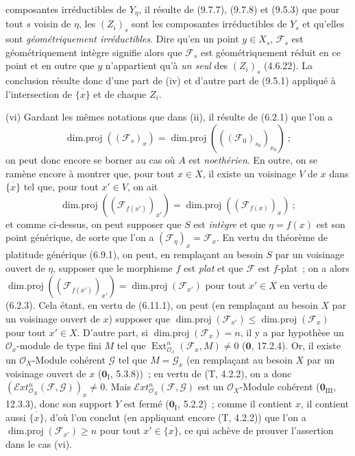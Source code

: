 
composantes irréductibles de $Y_\eta$, il résulte de (9.7.7), (9.7.8) et
(9.5.3) que pour tout $s$ voisin de $\eta$, les $(Z_i)_s$ sont les composantes
irréductibles de $Y_s$ et qu'elles sont \emph{géométriquement irréductibles}.
Dire qu'en un point $y\in X_s$, $\mathcal F_s$ est géométriquement intègre
signifie alors que $\mathcal F_s$ est géométriquement réduit en ce point et en
outre que $y$ n'appartient qu'à \emph{un seul} des $(Z_i)_s$ (4.6.22). La
conclusion résulte donc d'une part de (iv) et d'autre part de (9.5.1) appliqué à
l'intersection de $\overline{\{x\}}$ et de chaque $Z_i$.

(vi) Gardant les mêmes notations que dans (ii), il résulte de (6.2.1) que l'on
a
\[
\operatorname{dim.proj}((\mathcal F_s)_x)=
\operatorname{dim.proj}(((\mathcal F_0)_{s_0})_{x_0})~;
\]
on peut donc encore se borner au cas où $A$ est \emph{noethérien}. En outre, on
se ramène encore à montrer que, pour tout $x\in X$, il existe un voisinage $V$
de $x$ dans $\overline{\{x\}}$ tel que, pour tout $x'\in V$, on ait
\[
\operatorname{dim.proj}((\mathcal F_{f(x')})_{x'})=
\operatorname{dim.proj}((\mathcal F_{f(x)})_x)~;
\]
et comme ci-dessus, on peut supposer que $S$ est \emph{intègre} et que
$\eta=f(x)$ est son point générique, de sorte que l'on a
$(\mathcal F_\eta)_x=\mathcal F_x$. En vertu du théorème de platitude générique
(6.9.1), on peut, en remplaçant au besoin $S$ par un voisinage ouvert de
$\eta$, supposer que le morphisme $f$ est \emph{plat} et que $\mathcal F$ est
$f$-plat~; on a alors
$\operatorname{dim.proj}((\mathcal F_{f(x')})_{x'})=
\operatorname{dim.proj}(\mathcal F_{x'})$ pour tout $x'\in X$ en vertu de
(6.2.3). Cela étant, en vertu de (6.11.1), on peut (en remplaçant au besoin $X$
par un voisinage ouvert de $x$) supposer que
$\operatorname{dim.proj}(\mathcal F_{x'})\leq
\operatorname{dim.proj}(\mathcal F_x)$ pour tout $x'\in X$. D'autre part, si
$\operatorname{dim.proj}(\mathcal F_x)=n$, il y a par hypothèse un
$\mathcal O_x$-module de type fini $M$ tel que
$\operatorname{Ext}_{\mathcal O_x}^n(\mathcal F_x,M)\neq0$
($\mathbf 0$, 17.2.4). Or, il existe un $\mathcal O_X$-Module cohérent
$\mathcal G$ tel que $M=\mathcal G_x$ (en remplaçant au besoin $X$ par un
voisinage ouvert de $x$ ($\mathbf 0_{\mathrm I}$, 5.3.8))~; en vertu de
(T, 4.2.2), on a donc
$(\mathcal{E}xt_{\mathcal O_X}^n(\mathcal F,\mathcal G))_x\neq0$. Mais
$\mathcal{E}xt_{\mathcal O_X}^n(\mathcal F,\mathcal G)$ est un
$\mathcal O_X$-Module cohérent ($\mathbf 0_{\mathrm{III}}$, 12.3.3), donc son
support $Y$ est fermé ($\mathbf 0_{\mathrm I}$, 5.2.2)~; comme il contient $x$,
il contient aussi $\overline{\{x\}}$, d'où l'on conclut (en appliquant encore
(T, 4.2.2)) que l'on a
$\operatorname{dim.proj}(\mathcal F_{x'})\geq n$ pour tout
$x'\in\overline{\{x\}}$, ce qui achève de prouver l'assertion dans le cas (vi).

